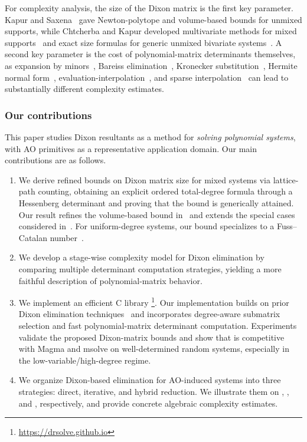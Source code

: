 For complexity analysis, the size of the Dixon matrix is the first key parameter. Kapur and Saxena~\cite{DBLP:conf/stoc/KapurS96} gave Newton-polytope and volume-based bounds for unmixed supports, while Chtcherba and Kapur developed multivariate methods for mixed supports~\cite{ChtcherbaKapur2004} and exact size formulas for generic unmixed bivariate systems~\cite{ChtcherbaKapur2004Bivariate}. A second key parameter is the cost of polynomial-matrix determinants themselves, as expansion by minors~\cite{GentlemanJohnson1976}, Bareiss elimination~\cite{HorowitzSahni1975}, Kronecker substitution~\cite{Li2007symbolic}, Hermite normal form~\cite{DBLP:journals/jc/LabahnNZ17}, evaluation-interpolation~\cite{HorowitzSahni1975}, and sparse interpolation~\cite{DBLP:journals/jsc/Huang23} can lead to substantially different complexity estimates.

\subsubsection*{Our contributions}
This paper studies Dixon resultants as a method for \emph{solving polynomial systems}, with AO primitives as a representative application domain. Our main contributions are as follows.

\begin{enumerate}
    \item We derive refined bounds on Dixon matrix size for mixed systems via lattice-path counting, obtaining an explicit ordered total-degree formula through a Hessenberg determinant and proving that the bound is generically attained. Our result refines the volume-based bound in~\cite{DBLP:conf/stoc/KapurS96} and extends the special cases considered in~\cite{ChtcherbaKapur2004Bivariate,cryptoeprint:2005/312}.
    For uniform-degree systems, our bound specializes to a Fuss--Catalan number~\cite{hilton1991catalan,DBLP:journals/dm/Aval08}.
    
    \item We develop a stage-wise complexity model for Dixon elimination by comparing multiple determinant computation strategies, yielding a more faithful description of polynomial-matrix behavior.
    
    \item We implement an efficient C library \drsolve\footnote{\url{https://drsolve.github.io}}. Our implementation builds on prior Dixon elimination techniques~\cite{DBLP:conf/issac/KapurSY94,cryptoeprint:2005/312,Albrecht2008} and incorporates degree-aware submatrix selection and fast polynomial-matrix determinant computation. Experiments validate the proposed Dixon-matrix bounds and show that \drsolve is competitive with Magma and msolve on well-determined random systems, especially in the low-variable/high-degree regime.
    
    \item We organize Dixon-based elimination for AO-induced systems into three strategies: direct, iterative, and hybrid reduction. We illustrate them on \poseidon, \vision, and \xhash, respectively, and provide concrete algebraic complexity estimates.
\end{enumerate}

